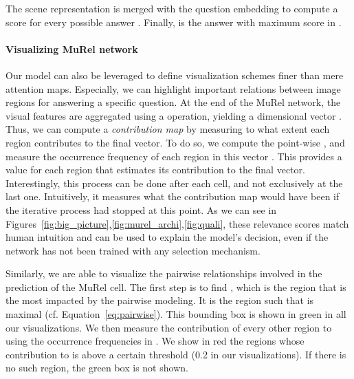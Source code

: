 \documentclass[10pt,twocolumn,letterpaper]{article}
\begin{document}
The scene representation  is merged with the question embedding  to compute a score for every possible answer . Finally,  is the answer with maximum score in .


\paragraph{Visualizing MuRel network}
Our model can also be leveraged to define visualization schemes finer than mere attention maps. 
Especially, we can highlight important relations between image regions for answering a specific question.
At the end of the MuRel network, the visual features  are aggregated using a  operation, yielding a dimensional vector . 
Thus, we can compute a \textit{contribution map} by measuring to what extent each region contributes to the final vector. 
To do so, we compute the point-wise , and measure the occurrence frequency of each region in this vector . This provides a value for each region that estimates its contribution to the final vector.
Interestingly, this process can be done after each cell, and not exclusively at the last one. Intuitively, it measures what the contribution map would have been if the iterative process had stopped at this point.
As we can see in Figures~\ref{fig:big_picture},\ref{fig:murel_archi},\ref{fig:quali}, these relevance scores match human intuition and can be used to explain the model's decision, even if the network has not been trained with any selection mechanism.

Similarly, we are able to visualize the pairwise relationships involved in the prediction of the MuRel cell. The first step is to find , which is the region that is the most impacted by the pairwise modeling. It is the region such that  is maximal (cf. Equation~\eqref{eq:pairwise}). This bounding box is shown in green in all our visualizations. We then measure the contribution of every other region to  using the occurrence frequencies in . We show in red the regions whose contribution to  is above a certain threshold (0.2 in our visualizations). If there is no such region, the green box is not shown.
\end{document}
